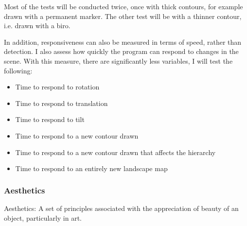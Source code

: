 \documentclass[11pt]{article}
\begin{document}
Most of the tests will be conducted twice, once with thick contours,
for example drawn with a permanent marker. The other test will be
with a thinner contour, i.e. drawn with a biro.

In addition, responsiveness can also be measured in terms of speed, rather
than detection. I also assess how quickly the program can respond
to changes in the scene. With this measure, there are significantly
less variables, I will test the following:

\begin{itemize}
	\item Time to respond to rotation
	\item Time to respond to translation
	\item Time to respond to tilt
	\item Time to respond to a new contour drawn
	\item Time to respond to a new contour drawn that affects the hierarchy
	\item Time to respond to an entirely new landscape map
\end{itemize}

\subsubsection{Aesthetics}
\begin{center}
	Aesthetics: A set of principles associated with the appreciation of beauty
	of an object, particularly in art. 
\end{center}
\end{document}
